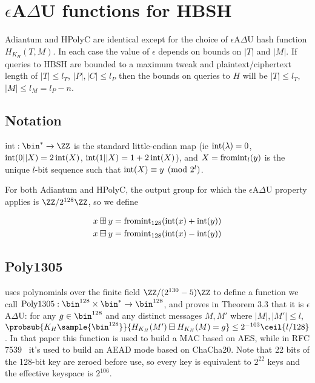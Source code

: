 \documentclass[eprint.tex]{subfiles}
\begin{document}
\section{\texorpdfstring{$\epsilon$A$\Delta$U}{𝜖A∆U} functions for HBSH}\label{hashing}

Adiantum and HPolyC are identical except for the choice of $\epsilon$A$\Delta$U hash function
$H_{K_H}(T, M)$. In each case the value of $\epsilon$ depends on bounds on $|T|$ and $|M|$.
If queries to HBSH are bounded to a maximum tweak and plaintext/ciphertext length of
$|T| \leq l_T$, $|P|, |C| \leq l_P$
then the bounds on queries to $H$ will be $|T| \leq l_T$, $|M| \leq l_M = l_P - n$.

\subsection{Notation}

$\intify: \bin^{*} \rightarrow \ZZ$ is the
standard little-endian map
(ie $\operatorname{int}(\lambda) = 0$, $\operatorname{int}(0 || X) = 2\operatorname{int}(X)$, $\operatorname{int}(1 || X) = 1 + 2\operatorname{int}(X)$),
and $X = \operatorname{fromint}_l(y)$ is the unique
$l$-bit sequence such that $\operatorname{int}(X) \equiv y \pmod{2^l}$.

For both Adiantum and HPolyC,
the output group for which the $\epsilon$A$\Delta$U property applies is
$\ZZ/2^{128}\ZZ$, so we define

\begin{align*}
    x \boxplus y &= \operatorname{fromint}_{128}(\operatorname{int}(x) + \operatorname{int}(y)) \\
    x \boxminus y &= \operatorname{fromint}_{128}(\operatorname{int}(x) - \operatorname{int}(y)) \\
\end{align*}

\subsection{Poly1305}

\cite{poly1305} uses polynomials over the finite field $\ZZ/(2^{130}-5)\ZZ$
to define a function we call
$\Polydjb: \bin^{128} \times \bin^* \rightarrow \bin^{128}$,
and proves in Theorem 3.3 that it is $\epsilon$A$\Delta$U: for any
$g \in \bin^{128}$ and any distinct messages $M, M'$ where $|M|, |M'| \leq l$,
$\probsub{K_H \sample{\bin^{128}}}{H_{K_H}(M') \boxminus H_{K_H}(M) = g} \leq 2^{-103}\ceil{l/128}$.
In that paper this function is used to build a MAC based on AES, while in
RFC 7539~\cite{RFC7539} it's used to build an AEAD mode based on ChaCha20.
Note that 22 bits of the 128-bit key are zeroed before use, so every key is equivalent to
$2^{22}$ keys and the effective keyspace is $2^{106}$.
\end{document}
